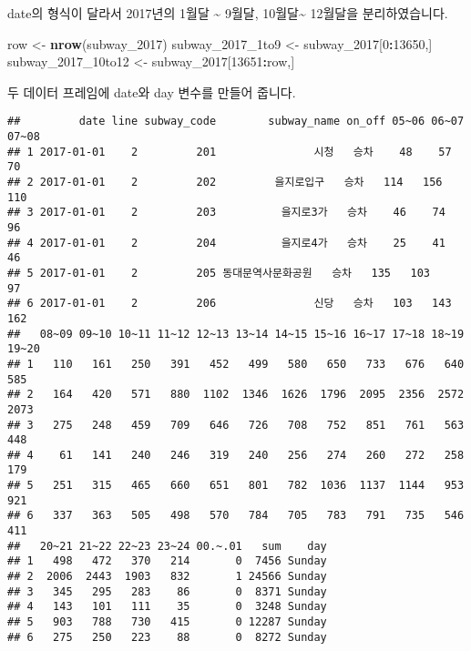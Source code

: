 \documentclass[]{article}
\newenvironment{Shaded}{\begin{snugshade}}{\end{snugshade}}
\newcommand{\KeywordTok}[1]{\textcolor[rgb]{0.13,0.29,0.53}{\textbf{#1}}}
\newcommand{\DecValTok}[1]{\textcolor[rgb]{0.00,0.00,0.81}{#1}}
\newcommand{\StringTok}[1]{\textcolor[rgb]{0.31,0.60,0.02}{#1}}
\newcommand{\OperatorTok}[1]{\textcolor[rgb]{0.81,0.36,0.00}{\textbf{#1}}}
\newcommand{\NormalTok}[1]{#1}
\begin{document}
date의 형식이 달라서 2017년의 1월달 \textasciitilde{} 9월달,
10월달\textasciitilde{} 12월달을 분리하였습니다.

\begin{Shaded}
\begin{Highlighting}[]
\NormalTok{row <-}\StringTok{ }\KeywordTok{nrow}\NormalTok{(subway_}\DecValTok{2017}\NormalTok{)}
\NormalTok{subway_2017_1to9 <-}\StringTok{ }\NormalTok{subway_}\DecValTok{2017}\NormalTok{[}\DecValTok{0}\OperatorTok{:}\DecValTok{13650}\NormalTok{,]}
\NormalTok{subway_2017_10to12 <-}\StringTok{ }\NormalTok{subway_}\DecValTok{2017}\NormalTok{[}\DecValTok{13651}\OperatorTok{:}\NormalTok{row,]}
\end{Highlighting}
\end{Shaded}

두 데이터 프레임에 date와 day 변수를 만들어 줍니다.

\begin{Shaded}
\end{Shaded}

\begin{verbatim}
##         date line subway_code        subway_name on_off 05~06 06~07 07~08
## 1 2017-01-01    2         201               시청   승차    48    57    70
## 2 2017-01-01    2         202         을지로입구   승차   114   156   110
## 3 2017-01-01    2         203          을지로3가   승차    46    74    96
## 4 2017-01-01    2         204          을지로4가   승차    25    41    46
## 5 2017-01-01    2         205 동대문역사문화공원   승차   135   103    97
## 6 2017-01-01    2         206               신당   승차   103   143   162
##   08~09 09~10 10~11 11~12 12~13 13~14 14~15 15~16 16~17 17~18 18~19 19~20
## 1   110   161   250   391   452   499   580   650   733   676   640   585
## 2   164   420   571   880  1102  1346  1626  1796  2095  2356  2572  2073
## 3   275   248   459   709   646   726   708   752   851   761   563   448
## 4    61   141   240   246   319   240   256   274   260   272   258   179
## 5   251   315   465   660   651   801   782  1036  1137  1144   953   921
## 6   337   363   505   498   570   784   705   783   791   735   546   411
##   20~21 21~22 22~23 23~24 00.~.01   sum    day
## 1   498   472   370   214       0  7456 Sunday
## 2  2006  2443  1903   832       1 24566 Sunday
## 3   345   295   283    86       0  8371 Sunday
## 4   143   101   111    35       0  3248 Sunday
## 5   903   788   730   415       0 12287 Sunday
## 6   275   250   223    88       0  8272 Sunday
\end{verbatim}
\end{document}
